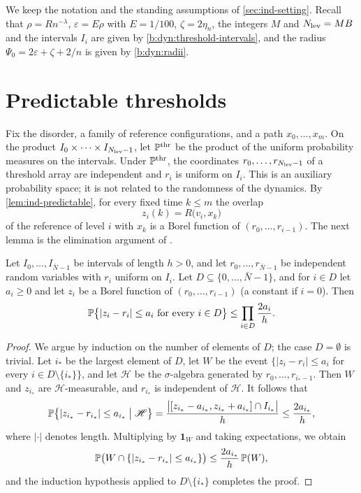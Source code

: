 We keep the notation and the standing assumptions of \cref{sec:ind-setting}. Recall that $\rho=Rn^{-\lambda}$, $\varepsilon=E\rho$ with $E=1/100$, $\zeta=2\eta_n$, the integers $M$ and $N_{\rm lev}=MB$ and the intervals $I_i$ are given by \eqref{b:dyn:threshold-intervals}, and the radius $\Psi_0=2\varepsilon+\zeta+2/n$ is given by \eqref{b:dyn:radii}.

\section{Predictable thresholds}\label{b:sec:dyn-count}

Fix the disorder, a family of reference configurations, and a path $x_0,\dots,x_m$. On the product $I_0\times\cdots\times I_{N_{\rm lev}-1}$, let $\mathbb P^{\rm thr}$ be the product of the uniform probability measures on the intervals. Under $\mathbb P^{\rm thr}$, the coordinates $r_0,\dots,r_{N_{\rm lev}-1}$ of a threshold array are independent and $r_i$ is uniform on $I_i$. This is an auxiliary probability space; it is not related to the randomness of the dynamics. By \cref{lem:ind-predictable}, for every fixed time $k\le m$ the overlap
\[
 z_i(k)=R\bigl(v_i,x_k\bigr)
\]
of the reference of level $i$ with $x_k$ is a Borel function of $(r_0,\dots,r_{i-1})$. The next lemma is the elimination argument of \cite[Section~8.5]{oai-barriers}.

\begin{lemma}\label{lem:bp-product}
Let $I_0,\dots,I_{\bar N-1}$ be intervals of length $h>0$, and let $r_0,\dots,r_{\bar N-1}$ be independent random variables with $r_i$ uniform on $I_i$. Let $D\subseteq\{0,\dots,\bar N-1\}$, and for $i\in D$ let $a_i\ge0$ and let $z_i$ be a Borel function of $(r_0,\dots,r_{i-1})$ (a constant if $i=0$). Then
\[
 \mathbb P\bigl\{|z_i-r_i|\le a_i\text{ for every }i\in D\bigr\}\le\prod_{i\in D}\frac{2a_i}{h}.
\]
\end{lemma}

\begin{proof}
We argue by induction on the number of elements of $D$; the case $D=\emptyset$ is trivial. Let $i_*$ be the largest element of $D$, let $W$ be the event $\{|z_i-r_i|\le a_i$ for every $i\in D\setminus\{i_*\}\}$, and let $\mathscr H$ be the $\sigma$-algebra generated by $r_0,\dots,r_{i_*-1}$. Then $W$ and $z_{i_*}$ are $\mathscr H$-measurable, and $r_{i_*}$ is independent of $\mathscr H$. It follows that
\[
 \mathbb P\bigl\{|z_{i_*}-r_{i_*}|\le a_{i_*}\bigm|\mathscr H\bigr\}
 =\frac{\bigl|[z_{i_*}-a_{i_*},z_{i_*}+a_{i_*}]\cap I_{i_*}\bigr|}{h}\le\frac{2a_{i_*}}{h},
\]
where $|\cdot|$ denotes length. Multiplying by $\mathbf 1_W$ and taking expectations, we obtain
\[
 \mathbb P\bigl(W\cap\{|z_{i_*}-r_{i_*}|\le a_{i_*}\}\bigr)\le\frac{2a_{i_*}}{h}\,\mathbb P(W),
\]
and the induction hypothesis applied to $D\setminus\{i_*\}$ completes the proof.
\end{proof}

